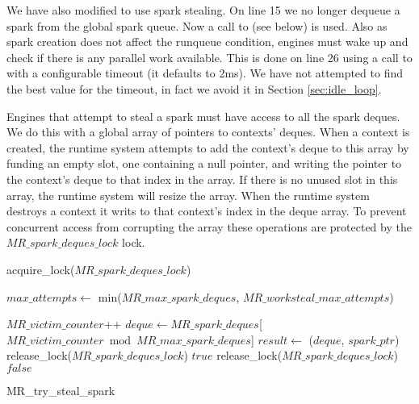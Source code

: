 We have also modified \getglobalwork to use spark stealing.
On line 15 we no longer dequeue a spark from the global spark queue.
Now a call to \trystealspark (see below) is used.
Also as spark creation does not affect the runqueue condition,
engines must wake up and check if there is any parallel work available.
This is done on line 26 using a call to  with a
configurable timeout (it defaults to 2ms).
We have not attempted to find the best value for the timeout,
in fact we avoid it in Section \ref{sec:idle_loop}.

Engines that attempt to steal a spark must have access to all the spark
deques.
We do this with a global array of pointers to contexts' deques.
When a context is created,
the runtime system attempts to add the context's deque to this array by
funding an empty slot,
one containing a null pointer,
and writing the pointer to the context's deque to that index in the array.
If there is no unused slot in this array, the runtime system will resize the
array.
When the runtime system destroys a context it writs \NULL to that context's
index in the deque array.
To prevent concurrent access from corrupting the array these operations are
protected by the $MR\_spark\_deques\_lock$ lock.

\begin{algorithm}
\begin{algorithmic}[1]
  \State acquire\_lock($MR\_spark\_deques\_lock$)

  \State $max\_attempts \gets$ min($MR\_max\_spark\_deques$,
    $MR\_worksteal\_max\_attempts$)

    \State $MR\_victim\_counter$++
    \State $deque \gets
       MR\_spark\_deques$[$MR\_victim\_counter \bmod MR\_max\_spark\_deques$]
      \State $result \gets$ \steal($deque$, $spark\_ptr$)
        \State release\_lock($MR\_spark\_deques\_lock$)
        \State \Return $true$
      \EndIf
    \EndIf 
  \EndFor
  \State release\_lock($MR\_spark\_deques\_lock$)
  \State \Return $false$
\EndProcedure
\end{algorithmic}
\caption{MR\_try\_steal\_spark}
\label{alg:try_steal_spark_initial}
\end{algorithm}

